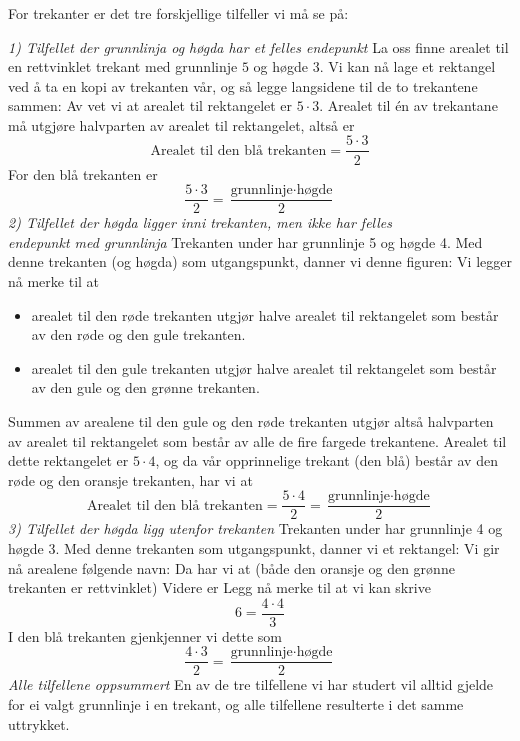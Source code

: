 \subsubsection{\artri \label{artri}}
For trekanter er det tre forskjellige tilfeller vi må se på: \vsk

\textit{1) Tilfellet der grunnlinja og høgda har et felles endepunkt} \os
La oss finne arealet til en rettvinklet trekant med grunnlinje $ 5 $ og høgde $ 3 $.
Vi kan nå lage et rektangel ved å ta en kopi av trekanten vår, og så legge langsidene til de to trekantene sammen:
Av  vet vi at arealet til rektangelet er $ {5\cdot 3} $. Arealet til én av trekantane må utgjøre halvparten av arealet til rektangelet, altså er
\[ \text{Arealet til den blå trekanten} = \frac{5\cdot 3}{2} \]
For den blå trekanten er 
\[\frac{5\cdot3}{2}= \frac{\text{grunnlinje}\cdot\text{høgde}}{2} \]
\newpage
\textit{2) Tilfellet der høgda ligger inni trekanten, men ikke har felles\\ endepunkt med grunnlinja} \os
Trekanten under har grunnlinje 5 og høgde 4.
Med denne trekanten (og høgda) som utgangspunkt, danner vi denne figuren:
Vi legger nå merke til at
\begin{itemize}
	\item arealet til den røde trekanten utgjør halve arealet til rektangelet som består av den røde og den gule trekanten.
	\item arealet til den gule trekanten utgjør halve arealet til rektangelet som består av den gule og den grønne trekanten.
\end{itemize}
Summen av arealene til den gule og den røde trekanten utgjør altså halvparten av arealet til rektangelet som består av alle de fire fargede trekantene. Arealet til dette rektangelet er $ 5\cdot4 $, og da vår opprinnelige trekant (den blå) består av den røde og den oransje trekanten, har vi at
\[ \text{Arealet til den blå trekanten}=\frac{5\cdot4}{2}=\frac{\text{grunnlinje}\cdot\text{høgde}}{2} \] 
\newpage
\textit{3) Tilfellet der høgda ligg utenfor trekanten} \os
Trekanten under har grunnlinje 4 og høgde 3. 
Med denne trekanten som utgangspunkt, danner vi et rektangel:
Vi gir nå arealene følgende navn:
Da har vi at (både den oransje og den grønne trekanten er rettvinklet)
Videre er
Legg nå merke til at vi kan skrive
\[ 6=\frac{4\cdot4}{3} \]
I den blå trekanten gjenkjenner vi dette som 
\[ \frac{4\cdot3}{2}=\frac{\text{grunnlinje}\cdot\text{høgde}}{2} \]
\newpage
\textit{Alle tilfellene oppsummert}\os
En av de tre tilfellene vi har studert vil alltid  gjelde for ei valgt grunnlinje i en trekant, og alle tilfellene resulterte i det samme uttrykket.\regv

